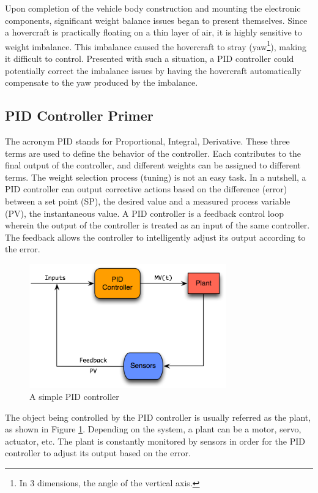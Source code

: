 Upon completion of the vehicle body construction and mounting the electronic components, significant
weight balance issues began to present themselves. Since a hovercraft is practically floating on a thin
layer of air, it is highly sensitive to weight imbalance. This imbalance caused
the hovercraft to stray (yaw\footnote{In 3 dimensions, the angle of the vertical axis.}), making it difficult to control.
Presented with such a situation, a PID controller could potentially correct the
imbalance issues by having the hovercraft automatically compensate to the yaw
produced by the imbalance.

\subsection{PID Controller Primer}
The acronym PID stands for Proportional, Integral, Derivative. These three
terms are used to define the behavior of the controller. Each contributes to the final output of the controller, and different weights can be
assigned to different terms. The weight selection process (tuning) is not an
easy task. In a nutshell, a PID controller can output corrective actions based
on the difference (error) between a set point (SP), the desired value and a
measured process variable (PV), the instantaneous value. A PID controller is a
feedback control loop wherein the output of the controller is treated as an
input of the same controller. The feedback allows the controller to
intelligently adjust its output according to the error. 

\begin{figure}[ht]
  \begin{center}
    \includegraphics[width=85mm]{imageSources/pidcontroller.png}
  \end{center}
  \caption{A simple PID controller} 
  \label{pidController}
\end{figure}

The object being controlled by the PID controller is usually referred as the
plant, as shown in Figure \ref{pidController}. Depending on the system, a plant can be a
motor, servo, actuator, etc. The plant is constantly monitored by 
sensors in order for the PID controller to adjust its output based on the error.

